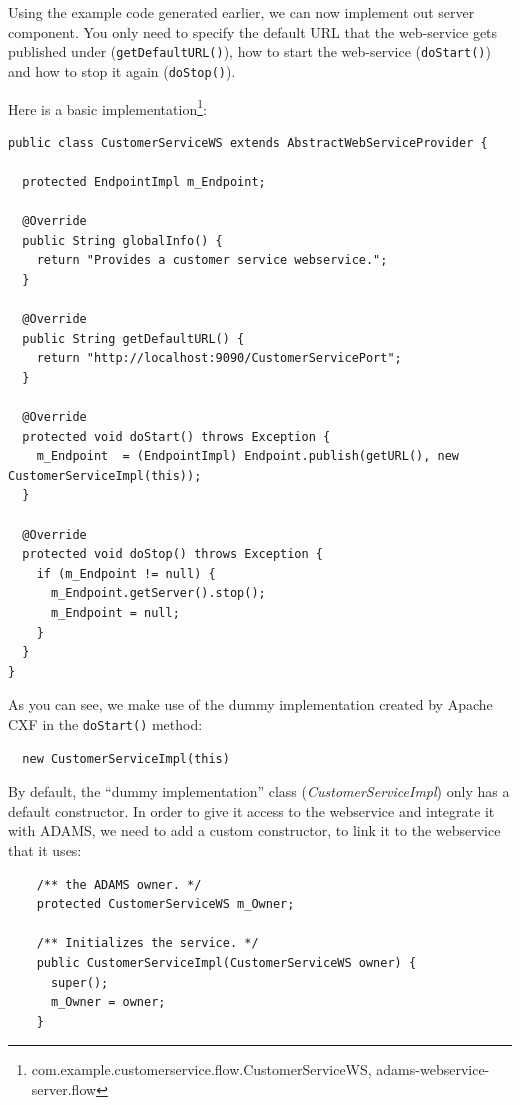 \documentclass[a4paper]{book}
\begin{document}
Using the example code generated earlier, we can now implement out server
component. You only need to specify the default URL that the web-service
gets published under (\texttt{getDefaultURL()}), how to start the web-service
(\texttt{doStart()}) and how to stop it again (\texttt{doStop()}).

Here is a basic implementation\footnote{com.example.customerservice.flow.CustomerServiceWS,
adams-webservice-server.flow}:
{\scriptsize
\begin{verbatim}
public class CustomerServiceWS extends AbstractWebServiceProvider {

  protected EndpointImpl m_Endpoint;
  
  @Override
  public String globalInfo() {
    return "Provides a customer service webservice.";
  }

  @Override
  public String getDefaultURL() {
    return "http://localhost:9090/CustomerServicePort";
  }

  @Override
  protected void doStart() throws Exception {
    m_Endpoint  = (EndpointImpl) Endpoint.publish(getURL(), new CustomerServiceImpl(this));
  }

  @Override
  protected void doStop() throws Exception {
    if (m_Endpoint != null) {
      m_Endpoint.getServer().stop();
      m_Endpoint = null;
    }
  }
}
\end{verbatim}}

As you can see, we make use of the dummy implementation created by Apache CXF
in the \texttt{doStart()} method:
\begin{verbatim}
  new CustomerServiceImpl(this)
\end{verbatim}

By default, the ``dummy implementation'' class (\textit{CustomerServiceImpl})
only has a default constructor. In order to give it access to the webservice
and integrate it with ADAMS, we need to add a custom constructor, to link it to the
webservice that it uses:
\begin{verbatim}
    /** the ADAMS owner. */
    protected CustomerServiceWS m_Owner;

    /** Initializes the service. */
    public CustomerServiceImpl(CustomerServiceWS owner) {
      super();
      m_Owner = owner;
    }
\end{verbatim}
\end{document}
